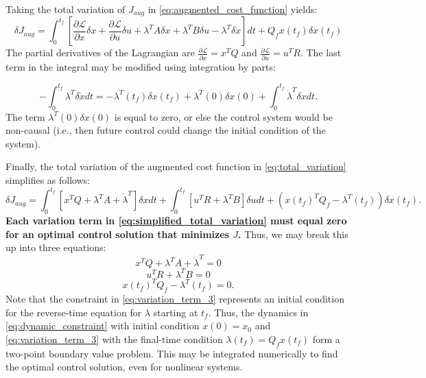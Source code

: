 \documentclass[a4 paper]{article}
\begin{document}
\bigbreak

Taking the total variation of \( J_{aug} \) in \ref{eq:augmented_cost_function} yields:
\begin{equation}
    \delta J_{aug} = \int_{0}^{t_f} \left[ \frac{\partial \mathcal{L}}{\partial x} \delta x + \frac{\partial \mathcal{L}}{\partial u} \delta u 
        + \lambda^T A \delta x + \lambda^T B \delta u - \lambda^T \delta \dot{x} \right] dt + Q_f x(t_f) \delta x(t_f)
\label{eq:total_variation}
\end{equation}
The partial derivatives of the Lagrangian are \( \frac{\partial \mathcal{L}}{\partial x} = x^T Q \) and 
\( \frac{\partial \mathcal{L}}{\partial u} = u^T R \). The last term in the integral may be modified using integration by parts:

\begin{equation}
    -\int_{0}^{t_f} \lambda^T \delta \dot{x} dt = -\lambda^T (t_f) \delta x(t_f) + \lambda^T (0) \delta x(0) + 
    \int_{0}^{t_f} \dot{\lambda}^T \delta x dt.
\label{eq:integration_by_parts}
\end{equation}
The term \( \lambda^T (0) \delta x(0) \) is equal to zero, or else the control system would be non-causal 
(i.e., then future control could change the initial condition of the system).

\bigbreak

Finally, the total variation of the augmented cost function in \ref{eq:total_variation} simplifies as follows:
\begin{equation}
    \delta J_{aug} = \int_{0}^{t_f} \left[ x^T Q + \lambda^T A + \dot{\lambda}^T \right] \delta x dt + 
    \int_{0}^{t_f} \left[ u^T R + \lambda^T B \right] \delta u dt + (x(t_f)^T Q_f - \lambda^T (t_f)) \delta x(t_f).
\label{eq:simplified_total_variation}
\end{equation}
\textbf{Each variation term in \ref{eq:simplified_total_variation} must equal zero for an optimal control solution that minimizes \( J \).} 
Thus, we may break this up into three equations:
\begin{equation}
    x^T Q + \lambda^T A + \dot{\lambda}^T = 0
\label{eq:variation_term_1}
\end{equation}
\begin{equation}
    u^T R + \lambda^T B = 0
\label{eq:variation_term_2}
\end{equation}
\begin{equation}
    x(t_f)^T Q_f - \lambda^T (t_f) = 0. 
\label{eq:variation_term_3}
\end{equation}
Note that the constraint in \ref{eq:variation_term_3} represents an initial condition for the reverse-time equation for 
\( \lambda \) starting at \( t_f \). Thus, the dynamics in \ref{eq:dynamic_constraint} with initial condition \( x(0) = x_0 \) 
and \ref{eq:variation_term_3} with the final-time condition \( \lambda (t_f) = Q_f x(t_f) \) form a two-point boundary value problem. 
This may be integrated numerically to find the optimal control solution, even for nonlinear systems.
\end{document}
